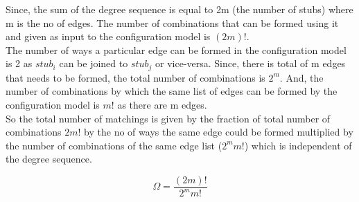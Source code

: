 \documentclass{article}
\begin{document}
Since, the sum of the degree sequence is equal to 2m (the number of stubs) where m is the no of edges. The number of combinations that can be formed using it and given as input to the configuration model is $(2m)!$.\\

The number of ways a particular edge can be formed in the configuration model is 2 as $stub_i$ can be joined to $stub_j$ or vice-versa. Since, there is total of m edges that needs to be formed, the total number of combinations is $2^m$. And, the number of combinations by which the same list of edges can be formed by the configuration model is $m!$ as there are m edges.\\

So the total number of matchings is given by the fraction of total number of combinations $2m!$ by the no of ways the same edge could be formed multiplied by the number of combinations of the same edge list ($2^m m!$) which is independent of the degree sequence.

$$ \Omega = \dfrac{(2m)!}{2^m m!}$$ 
 
\end{document}
